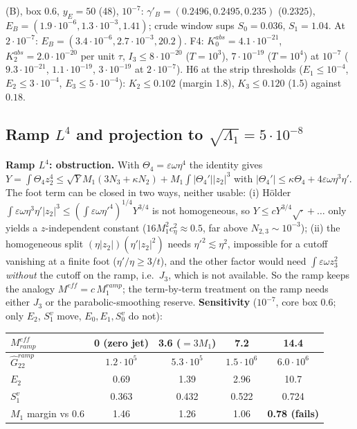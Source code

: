 \documentclass[11pt]{article}
\begin{document}
(B), box 0.6, $y_E=50$ (48), $10^{-7}$: $\gamma'_B=(0.2496,0.2495,0.235)$ ($0.2325$), $E_B=(1.9\cdot10^{-6},1.3\cdot10^{-3},1.41)$; crude window sups $S_0=0.036$, $S_1=1.04$. At $2\cdot10^{-7}$: $E_B=(3.4\cdot10^{-6},2.7\cdot10^{-3},20.2)$. F4: $K_0^{abs}=4.1\cdot10^{-21}$, $K_2^{abs}=2.0\cdot10^{-20}$ per unit $\tau$, $I_3\le8\cdot10^{-20}$ ($T=10^3$), $7\cdot10^{-19}$ ($T=10^4$) at $10^{-7}$ ($9.3\cdot10^{-21}$, $1.1\cdot10^{-19}$, $3\cdot10^{-19}$ at $2\cdot10^{-7}$).
H6 at the strip thresholds ($E_1\le10^{-4}$, $E_2\le3\cdot10^{-4}$, $E_3\le5\cdot10^{-4}$): $K_2\le0.102$ (margin 1.8), $K_3\le0.120$ (1.5) against $0.18$.
\subsection*{Ramp $L^4$ and projection to $\sqrt{\Lambda_1}=5\cdot10^{-8}$}
\textbf{Ramp $L^4$: obstruction.} With $\Theta_4=\varepsilon\omega\eta^4$ the identity gives $Y=\int\Theta_4z_2^4\le\sqrt Y M_1(3N_3+\kappa N_2)+M_1\int|\Theta_4'||z_2|^3$ with $|\Theta_4'|\le\kappa\Theta_4+4\varepsilon\omega\eta^3\eta'$. The foot term can be closed in two ways, neither usable: (i) Hölder $\int\varepsilon\omega\eta^3\eta'|z_2|^3\le(\int\varepsilon\omega\eta'^4)^{1/4}Y^{3/4}$ is not homogeneous, so $Y\le cY^{3/4}\sqrt{\cdot}+\dots$ only yields a $z$-independent constant ($16M_1^2c_\eta^2\approx0.5$, far above $N_{2,3}\sim10^{-3}$); (ii) the homogeneous split $(\eta|z_2|)(\eta'|z_2|^2)$ needs $\eta'^2\lesssim\eta^2$, impossible for a cutoff vanishing at a finite foot ($\eta'/\eta\ge3/t$), and the other factor would need $\int\varepsilon\omega z_3^2$ \emph{without} the cutoff on the ramp, i.e.\ $J_3$, which is not available. So the ramp keeps the analogy $M^{eff}=c\,M_1^{ramp}$; the term-by-term treatment on the ramp needs either $J_3$ or the parabolic-smoothing reserve. \textbf{Sensitivity} ($10^{-7}$, core box 0.6; only $E_2$, $S_1^v$ move, $E_0,E_1,S_0^v$ do not):
\begin{center}\small\begin{tabular}{lcccc}
$M^{eff}_{ramp}$ & 0 (zero jet) & 3.6 ($=3M_1$) & 7.2 & 14.4\\\hline
$\hat G^{ramp}_{22}$ & $1.2\cdot10^5$ & $5.3\cdot10^5$ & $1.5\cdot10^6$ & $6.0\cdot10^6$\\
$E_2$ & 0.69 & 1.39 & 2.96 & 10.7\\
$S_1^v$ & 0.363 & 0.432 & 0.522 & 0.724\\
$M_1$ margin vs 0.6 & 1.46 & 1.26 & 1.06 & \textbf{0.78 (fails)}
\end{tabular}\end{center}
\end{document}
